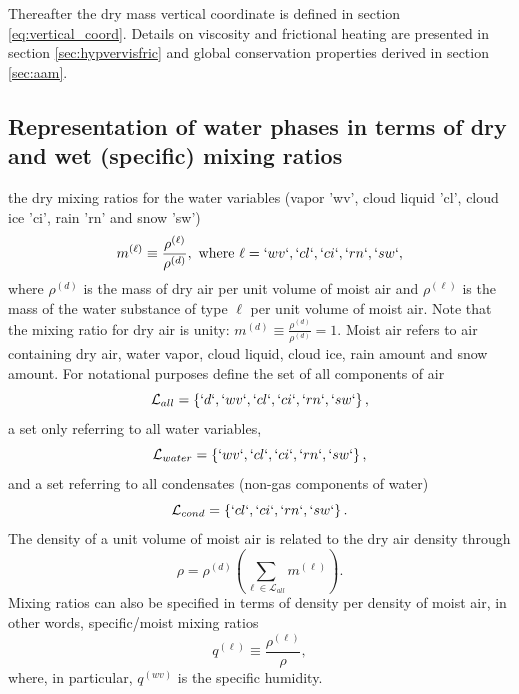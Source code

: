 \documentclass{agujournal}
\begin{document}
{%




Thereafter the dry mass vertical coordinate is defined in section \ref{eq:vertical_coord}. Details on viscosity and frictional heating are presented in section \ref{sec:hypvervisfric} and global conservation properties derived in section \ref{sec:aam}.
\subsection{Representation of water phases in terms of dry and wet (specific) mixing ratios}\label{sec:mixing_ratios}
{} the dry mixing ratios for the water variables (vapor 'wv', cloud liquid 'cl', cloud ice 'ci', rain 'rn' and snow 'sw')
\begin{equation}
m^{(\ell)}\equiv \frac{\rho^{(\ell)}}{\rho^{(d)}}, \text{ where }\ell=`wv`,`cl`,`ci`,`rn`,`sw`,\label{eq:mx}
\end{equation}
where $\rho^{(d)}$ is the mass of dry air per unit volume of moist air and $\rho^{(\ell)}$ is the mass of the water substance of type $\ell$ per unit volume of moist air. Note that the mixing ratio for dry air is unity: $m^{(d)}\equiv \frac{\rho^{(d)}}{\rho^{(d)}}=1$. 
Moist air refers to air containing dry air, water vapor, cloud liquid, cloud ice, rain amount and snow amount. For notational purposes define the set of all components of air
\begin{equation}
\mathcal{L}_{all}=\left\{ `d`,`wv`,`cl`,`ci`,`rn`,`sw`\right\},
\end{equation}
a set only referring to all water variables,
\begin{equation}
\mathcal{L}_{water}=\left\{`wv`,`cl`,`ci`,`rn`,`sw`\right\},
\end{equation}
and a set referring to all condensates (non-gas components of water)
\begin{equation}
\mathcal{L}_{cond}=\left\{`cl`,`ci`,`rn`,`sw`\right\}.
\end{equation}
The density of a unit volume of moist air is related to the dry air density through
\begin{equation}
\label{eq:rhosum}
\rho=\rho^{(d)}\left(\sum_{\ell \in \mathcal{L}_{all}} m^{(\ell)}\right).
\end{equation}
Mixing ratios can also be specified in terms of density per density of moist air, in other words, specific/moist mixing ratios
\begin{equation}
q^{(\ell)}\equiv \frac{\rho^{(\ell)}}{\rho},\label{eq:qx}
\end{equation}
where, in particular, $q^{(wv)}$ is the specific humidity. 


}
\end{document}
